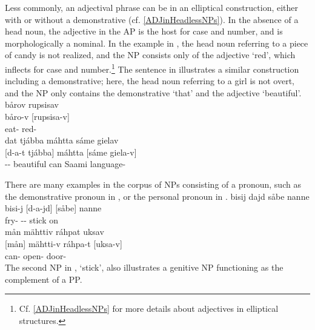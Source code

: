 Less commonly, an adjectival phrase can be in an elliptical construction, either with or without a demonstrative (cf. \SEC\ref{ADJinHeadlessNPs}). In the absence of a head noun, the adjective in the AP is the host for case and number, and is morphologically a nominal. In the example in , the head noun referring to a piece of candy is not realized, and the NP consists only of the adjective  ‘red’, which inflects for case and number.\footnote{Cf. \SEC\ref{ADJinHeadlessNPs} for more details about adjectives in elliptical structures.} 
The sentence in  illustrates a similar construction including a demonstrative; here, the head noun referring to a girl is not overt, and the NP only contains the demonstrative  ‘that’ and the adjective  ‘beautiful’. 
\ea\label{NPstructureEx8}
\glll	bårov rupsisav\\
	båro-v {[rupsisa-v]\subNP}\\
	eat- red-\\\nopagebreak
{}	
\z
\ea\label{adjNPheadEx3repeat}%
\glll	dat tjábba máhtta sáme gielav\\
	{[d-a-t} {tjábba]\subNP{}} máhtta {[sáme} {giela-v]\subNP{}}\\
	-- beautiful\BS{} can\BS{} Saami\BS{} language-\\\nopagebreak
{}	%
\z

There are many examples in the corpus of NPs consisting of a pronoun, such as the demonstrative pronoun  in , or the personal pronoun  in . %
\ea\label{NPstructureProEx1}
\glll	bisij dajd såbe nanne\\
	bisi-j {[d-a-jd]\subNP{}} {[såbe]\subNP{}} nanne\\
	fry- -- stick\BS{} on\\\nopagebreak
{}	
\z
\ea\label{NPstructureProEx2}
\glll	mån mähttiv ráhpat uksav\\
	{[mån]\subNP{}} mähtti-v ráhpa-t {[uksa-v]\subNP{}}\\
	 can- open- door-\\\nopagebreak
{}	
\z
The second NP in ,  ‘stick’, also illustrates a genitive NP functioning as the complement of a PP. 

